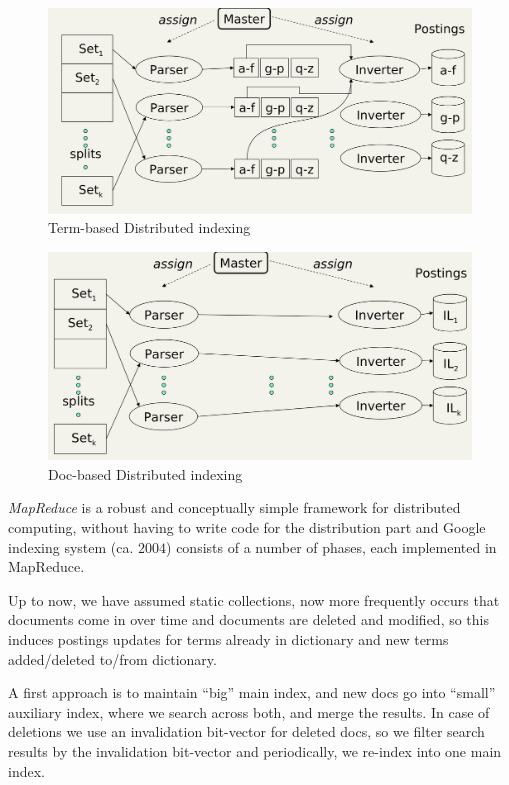\begin{figure}
	\caption{Term-based Distributed indexing}
	\label{img:termBased}
	\includegraphics[width=\textwidth]{Images/termBased}
\end{figure}
\begin{figure}
	\caption{Doc-based Distributed indexing}
	\label{img:docBased}
	\includegraphics[width=\textwidth]{Images/docBased}
\end{figure}
\emph{MapReduce} is a robust and conceptually simple framework for distributed computing, 
without having to write code for the distribution part and Google indexing system (ca. $2004$) 
consists of a number of phases, each implemented in MapReduce.

Up to now, we have assumed static collections, now more frequently occurs that documents come in over time
and documents are deleted and modified, so this induces postings updates for terms already in dictionary
and new terms added/deleted to/from dictionary.

A first approach is to maintain “big” main index, and new docs go into “small” auxiliary index, where 
we search across both, and merge the results.\newline
In case of deletions we use an invalidation bit-vector for deleted docs, so we filter search results
by the invalidation bit-vector and periodically, we re-index into one main index.

